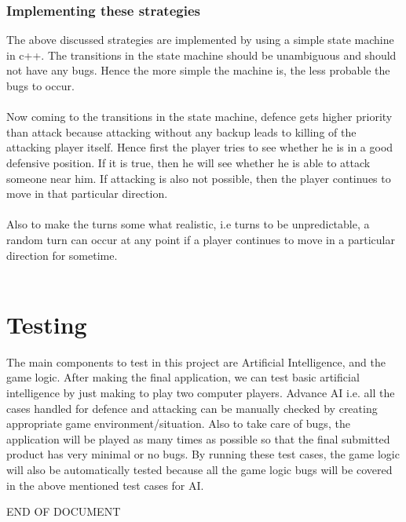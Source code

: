 \documentclass[14 pt]{article}
\begin{document}
\subsubsection{Implementing these strategies}
    The above discussed strategies are implemented by using a simple state machine in c++. The transitions in the state machine should be unambiguous and should not have any bugs. Hence the more simple the machine is, the less probable the bugs to occur.\\\\
    Now coming to the transitions in the state machine, defence gets higher priority than attack because attacking without any backup leads to killing of the attacking player itself. Hence first the player tries to see whether he is in a good defensive position. If it is true, then he will see whether he is able to attack someone near him. If attacking is also not possible, then the player continues to move in that particular direction.\\\\
    Also to make the turns some what realistic, i.e turns to be unpredictable, a random turn can occur at any point if a player continues to move in a particular direction for sometime.\\\\

\section{Testing}
    The main components to test in this project are Artificial Intelligence, and the game logic. After making the final application, we can test basic artificial intelligence by just making to play two computer players. Advance AI i.e. all the cases handled for defence and attacking can be manually checked by creating appropriate game environment/situation. Also to take care of bugs, the application will be played as many times as possible so that the final submitted product has very minimal or no bugs. By running these test cases, the game logic will also be automatically tested because all the game logic bugs will be covered in the above mentioned test cases for AI.
%
%
\begin{center}
END OF DOCUMENT
\end{center}
\end{document}
